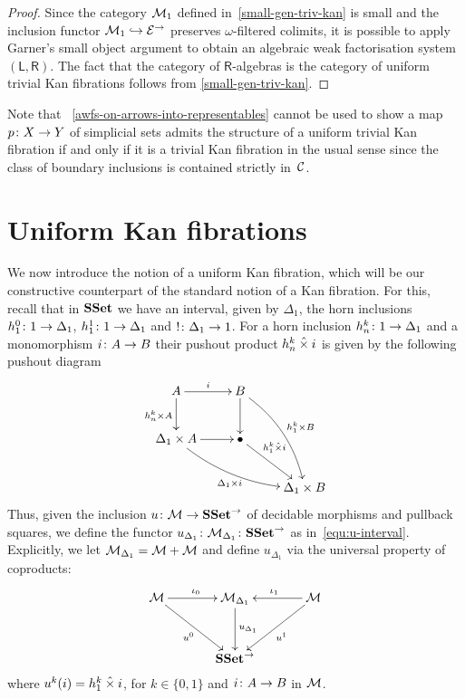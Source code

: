 \documentclass[reqno,10pt,a4paper,oneside]{amsart}
\begin{document}
\begin{proof} Since the category $\cal{M}_1$ defined in~\cref{small-gen-triv-kan} is small and
the inclusion functor $\cal{M}_1 \hookrightarrow \catE^\to$ preserves $\omega$-filtered colimits, 
it is possible to apply Garner's small object argument to
obtain an algebraic weak factorisation system $(\mathsf{L}, \mathsf{R})$.
The fact that the category of $\mathsf{R}$-algebras is the category of uniform trivial Kan fibrations
 follows from \cref{small-gen-triv-kan}.
 \end{proof} 

Note that ~\cref{awfs-on-arrows-into-representables} cannot be used to show 
a map $p \co X \to Y$ of simplicial sets admits the structure of a uniform trivial Kan fibration if and only if it is a trivial Kan fibration in the usual sense since  the class of boundary inclusions  is contained strictly  in~$\cal{C}$. 




\section{Uniform Kan fibrations}
\label{section-kan-fib}

We now introduce the notion of a uniform Kan fibration, which will be our constructive counterpart
of the standard notion of a Kan fibration. For this, recall that in $\SSet$ we have an interval, given by
$\Delta_1$, the horn inclusions $h^0_1 \co 1 \to \Delta_1$, $h^1_1 \co 1 \to \Delta_1$ and $! \co
\Delta_1 \to 1$. For a horn inclusion $h^{k}_n \co 1 \to \Delta_1$ and  a monomorphism $i \co A \to B$
their pushout product $h^k_n \hattimes i$ is given by the following pushout diagram
\[
\xymatrix{
 A \ar[r]^{i}  \ar[d]_{h^k_n \times A} &  B \ar@/^1em/[ddr]^{h^k_1 \times B} \ar[d] & \\ 
\Delta_1 \times A \ar@/_1em/[drr]_{\Delta_1 \times i} \ar[r] & \bullet \ar[dr]^-(.35){h^k_1 \hattimes i}  & \\ 
 & & \Delta_1 \times B} 
 \]
 Thus, given the inclusion $u \co \cal{M} \to \SSet^\to$ of decidable morphisms and pullback squares, 
 we define the functor $u_{\Delta_1} \co \cal{M}_{\Delta_1} \co \SSet^\to$ as in~\eqref{equ:u-interval}. 
 Explicitly, we let $\cal{M}_{\Delta_1} = \cal{M} + \cal{M}$ and define $u_{\Delta_1}$ via the universal
 property of coproducts:
  \[
 \xymatrix@R=1.2cm@C=1.2cm{
 \cal{M} \ar[dr]_{u^0}  \ar[r]^{\iota_0} &  \cal{M}_{\Delta_1} \ar[d]^{u_{\Delta_1}} & \cal{M} \ar[dl]^{u^1} \ar[l]_{\iota_1} \\
  & \SSet^\to & }
  \]
  where $u^k(i) = h^k_1 \hattimes i$,   for $k \in \{ 0, 1 \}$ and $i \co A \to B$ in $\cal{M}$. 
   
\end{document}
